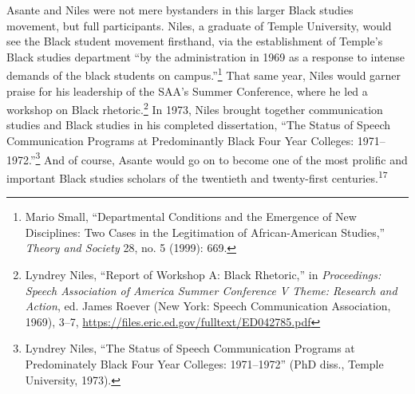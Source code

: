 \documentclass{tufte-handout}
\begin{document}
Asante and Niles were not mere bystanders in this larger Black studies
movement, but full participants. Niles, a graduate of Temple University,
would see the Black student movement firsthand, via the establishment of
Temple's Black studies department ``by the administration in 1969 as a
response to intense demands of the black students on
campus.''\footnote{Mario Small, ``Departmental Conditions and the Emergence of New
  Disciplines: Two Cases in the Legitimation of African-American
  Studies,'' \emph{Theory and Society} 28, no. 5 (1999): 669.
} That same year, Niles
would garner praise for his leadership of the SAA's Summer Conference,
where he led a workshop on Black
rhetoric.\footnote{Lyndrey Niles, ``Report of Workshop A: Black Rhetoric,'' in
  \emph{Proceedings: Speech Association of America Summer Conference V
  Theme: Research and Action}, ed. James Roever (New York: Speech
  Communication Association, 1969), 3--7,
  \url{https://files.eric.ed.gov/fulltext/ED042785.pdf}
} In 1973, Niles brought
together communication studies and Black studies in his completed
dissertation, ``The Status of Speech Communication Programs at
Predominantly Black Four Year Colleges:
1971--1972.''\footnote{Lyndrey Niles, ``The Status of Speech Communication Programs at
  Predominately Black Four Year Colleges: 1971--1972'' (PhD diss.,
  Temple University, 1973).
} And of course,
Asante would go on to become one of the most prolific and important
Black studies scholars of the twentieth and twenty-first
centuries.\textsuperscript{17}
\end{document}
